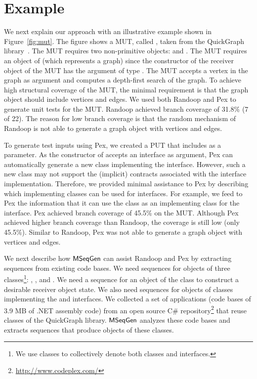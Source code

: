 \section{Example}
\label{sec:example}

We next explain our approach with an illustrative example shown in Figure~\ref{fig:mut}. The figure shows a MUT, called , taken from the QuickGraph library~\cite{QUICKGRAPH}. The MUT requires two non-primitive objects:  and . The MUT requires an object of  (which represents a graph) since the constructor of the receiver object of the MUT has the argument of type . The MUT accepts a vertex in the graph as argument and computes a depth-first search of the graph. To achieve high structural coverage of the MUT, the minimal requirement is that the graph object should include vertices and edges. We used both Randoop and Pex to generate unit tests for the MUT. Randoop achieved branch coverage of 31.8\% (7 of 22). The reason for low branch coverage is that the random mechanism of Randoop is not able to generate a graph object with vertices and edges. 

To generate test inputs using Pex, we created a PUT that includes  as a parameter. As the constructor of  accepts an interface  as argument, Pex can automatically generate a new class implementing the  interface. However, such a new class may not support the (implicit) contracts associated with the interface implementation. Therefore, we provided minimal assistance to Pex by describing which implementing classes can be used for interfaces. For example, we feed to Pex the information that it can use the  class as an implementing class for the  interface. Pex achieved branch coverage of 45.5\% on the MUT. Although Pex achieved higher branch coverage than Randoop, the coverage is still low (only 45.5\%). Similar to Randoop, Pex was not able to generate a graph object with vertices and edges.

We next describe how $\textsf{MSeqGen} $ can assist Randoop and Pex by extracting sequences from existing code bases. 
We need sequences for objects of three classes\footnote{We use classes to collectively denote both classes and interfaces.}: , , and . We need a  sequence for an object of the  class to construct a desirable receiver object state. We also need sequences for objects of classes implementing the  and  interfaces. 
We collected a set of applications (code bases of 3.9 MB of .NET assembly code) from an open source C\# repository\footnote{\url{http://www.codeplex.com/}} that reuse classes of the QuickGraph library.
$\textsf{MSeqGen} $ analyzes these code bases and extracts sequences that produce objects of these classes.

